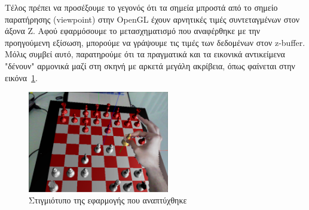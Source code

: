 Τέλος πρέπει να προσέξουμε το γεγονός ότι τα σημεία μπροστά από το σημείο παρατήρησης (viewpoint) στην OpenGL έχουν αρνητικές τιμές συντεταγμένων στον άξονα Z. Αφού εφαρμόσουμε το μετασχηματισμό που αναφέρθηκε με την προηγούμενη εξίσωση, μπορούμε να γράψουμε τις τιμές των δεδομένων στον z-buffer. Μόλις συμβεί αυτό, παρατηρούμε ότι τα πραγματικά και τα εικονικά αντικείμενα "δένουν" αρμονικά μαζί στη σκηνή με αρκετά μεγάλη ακρίβεια, όπως φαίνεται στην εικόνα~\ref{fig:occlusion}.



\begin{figure}[H]
    \centering
    \includegraphics[width=0.55\textwidth]{Files/Figures/correct.png}
    \caption[Στιγμιότυπο της εφαρμογής που αναπτύχθηκε]{Στιγμιότυπο της εφαρμογής που αναπτύχθηκε}
    \label{fig:occlusion}
\end{figure}











